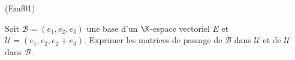 \begin{tiny}(Emf01)\end{tiny}
Soit $\mathcal{B}=(e_{1},e_{2},e_{3})$ une base d'un $\K$-espace vectoriel $E$ et $\mathcal{U}=(e_{1},e_{2},e_{2}+e_{3})$. Exprimer les matrices de passage de $\mathcal{B}$ dans $\mathcal{U}$ et de $\mathcal{U}$ dans $\mathcal{B}$.